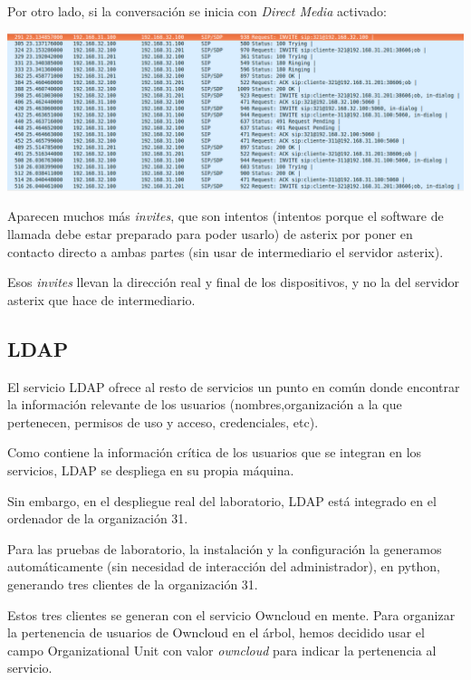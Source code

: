 \documentclass[]{article}
\begin{document}
Por otro lado, si la conversación se inicia con \textit{Direct Media} activado:

\begin{center}
	\includegraphics[width=1\linewidth]{images/voip11}
\end{center}

Aparecen muchos más \textit{invites}, que son intentos (intentos porque el software de llamada debe estar preparado para poder usarlo) de asterix por poner en contacto directo a ambas partes (sin usar de intermediario el servidor asterix).

Esos \textit{invites} llevan la dirección real y final de los dispositivos, y no la del servidor asterix que hace de intermediario.

\subsection{LDAP}
El servicio LDAP ofrece al resto de servicios un punto en común donde encontrar la información relevante de los usuarios (nombres,organización a la que pertenecen, permisos de uso y acceso, credenciales, etc).

Como contiene la información crítica de los usuarios que se integran en los servicios, LDAP se despliega en su propia máquina.

Sin embargo, en el despliegue real del laboratorio, LDAP está integrado en el ordenador de la organización 31.

Para las pruebas de laboratorio, la instalación y la configuración la generamos automáticamente (sin necesidad de interacción del administrador), en python, generando tres clientes de la organización 31.

Estos tres clientes se generan con el servicio Owncloud en mente. Para organizar la pertenencia de usuarios de Owncloud en el árbol, hemos decidido usar el campo Organizational Unit con valor \textit{owncloud} para indicar la pertenencia al servicio.
                                                                                                                                                                                                                                                                    
\end{document}

